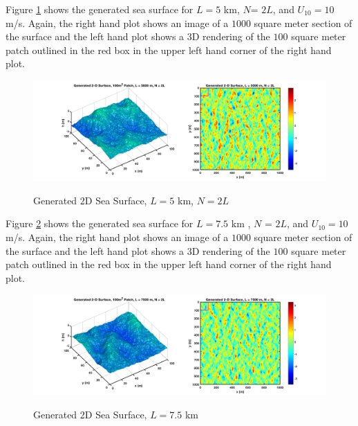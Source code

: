 Figure \ref{os_fig:11} shows the generated sea surface for $L = 5$ km, $N$= $2L$, and $U_{10} = 10$ m/s. Again, the right hand plot shows an image of a $1000$ square meter section of the surface and the left hand plot shows a 3D rendering of the $100$ square meter patch outlined in the red box in the upper left hand corner of the right hand plot.

\begin{figure}[H]
  \begin{center}
\includegraphics[width=6in]{../media/Ocean_Surface/sea_surface_2d_surf_5000.png}
  \end{center}
  \renewcommand{\baselinestretch}{1} \small\normalsize
  \begin{quote}
    \caption[Generated 2D Sea Surface, $L = 5$ km, $N=2L$]{Generated 2D Sea Surface, $L = 5$ km, $N=2L$ \label{os_fig:11}}
  \end{quote}
\end{figure}
\renewcommand{\baselinestretch}{2} \small\normalsize

Figure \ref{os_fig:12} shows the generated sea surface for $L = 7.5$ km , $N$ = $2L$, and $U_{10} = 10$ m/s. Again, the right hand plot shows an image of a $1000$ square meter section of the surface and the left hand plot shows a 3D rendering of the $100$ square meter patch outlined in the red box in the upper left hand corner of the right hand plot.

\begin{figure}[H]
  \begin{center}
\includegraphics[width=6in]{../media/Ocean_Surface/sea_surface_2d_surf_7500.png}
  \end{center}
  \renewcommand{\baselinestretch}{1} \small\normalsize
  \begin{quote}
    \caption[Generated 2D Sea Surface, $L = 7.5$ km]{Generated 2D Sea Surface, $L = 7.5$ km \label{os_fig:12}}
  \end{quote}
\end{figure}
\renewcommand{\baselinestretch}{2} \small\normalsize

